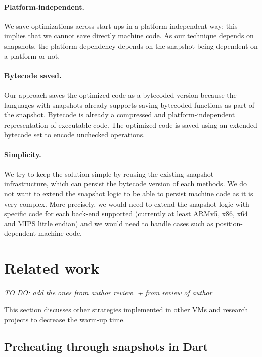 \documentclass[a4paper,12pt,twoside]{../includes/ThesisStyle}
\begin{document}
\paragraph{Platform-independent.}We save optimizations across start-ups in a platform-independent way: this implies that we cannot save directly machine code. As our technique depends on snapshots, the platform-dependency depends on the snapshot being dependent on a platform or not. 

\paragraph{Bytecode saved.}Our approach saves the optimized code as a bytecoded version because the languages with snapshots already supports saving bytecoded functions as part of the snapshot. Bytecode is already a compressed and platform-independent representation of executable code. The optimized code is saved using an extended bytecode set to encode unchecked operations. %

\paragraph{Simplicity.}We try to keep the solution simple by reusing the existing snapshot infrastructure, which can persist the bytecode version of each methods. We do not want to extend the snapshot logic to be able to persist machine code as it is very complex. More precisely, we would need to extend the snapshot logic with specific code for each back-end supported (currently at least ARMv5, x86, x64 and MIPS little endian) and we would need to handle cases such as position-dependent machine code.


\section{Related work}
\label{sec:relWork}

\emph{TO DO: add the ones from author review.
+ from review of author}

This section discusses other strategies implemented in other VMs and research projects to decrease the warm-up time.

\subsection{Preheating through snapshots in Dart}
\end{document}
